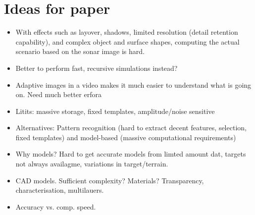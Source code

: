 \documentclass[
   article                                      %
 , 12pt                                         %
 , xelatex                                      %
 , bibtex                                       %
 , layout
]{common/mytemplate}
\begin{document}
\section{Ideas for paper}

\begin{itemize}
\item With effects such as layover, shadows, limited resolution (detail retention capability), and complex object and surface shapes, computing the actual scenario based on the sonar image is hard.
\item Better to perform fast, recursive simulations instead?
\item Adaptive images in a video makes it much easier to understand what is going on. Need much better erfora
\item Litits: massive storage, fixed templates, amplitude/noise sensitive
\item Alternatives: Pattern recognition (hard to extract decent features, selection, fixed templates) and model-based (massive computational requirements)
\item Why models? Hard to get accurate models from limted amount dat, targets not always availagme, variations in target/terrain.
\item CAD models. Sufficient complexity? Materials? Transparency, characterisation, multilauers.
\item Accuracy vs. comp. speed.
\end{itemize}

\newpage


% 
\end{document}
